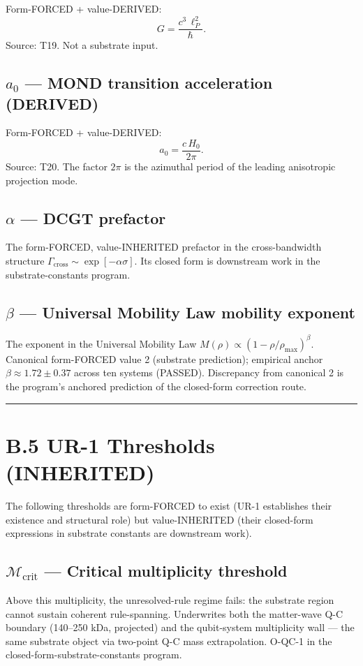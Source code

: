 \documentclass[11pt]{book}
\begin{document}
Form-FORCED + value-DERIVED:
\[
G = \frac{c^3\,\ell_P^2}{\hbar}.
\]
Source: T19. Not a substrate input.

\subsection{$a_0$ — MOND transition acceleration (DERIVED)}

Form-FORCED + value-DERIVED:
\[
a_0 = \frac{c\,H_0}{2\pi}.
\]
Source: T20. The factor $2\pi$ is the azimuthal period of the leading anisotropic projection mode.

\subsection{$\alpha$ — DCGT prefactor}

The form-FORCED, value-INHERITED prefactor in the cross-bandwidth structure $\Gamma_\mathrm{cross}\sim\exp[-\alpha\sigma]$. Its closed form is downstream work in the substrate-constants program.

\subsection{$\beta$ — Universal Mobility Law mobility exponent}

The exponent in the Universal Mobility Law $M(\rho) \propto (1 - \rho/\rho_\mathrm{max})^\beta$. Canonical form-FORCED value 2 (substrate prediction); empirical anchor $\beta \approx 1.72 \pm 0.37$ across ten systems (PASSED). Discrepancy from canonical 2 is the program's anchored prediction of the closed-form correction route.

\bigskip\hrule\bigskip

\section{B.5 UR-1 Thresholds (INHERITED)}

The following thresholds are form-FORCED to exist (UR-1 establishes their existence and structural role) but value-INHERITED (their closed-form expressions in substrate constants are downstream work).

\subsection{$\mathcal{M}_\mathrm{crit}$ — Critical multiplicity threshold}

Above this multiplicity, the unresolved-rule regime fails: the substrate region cannot sustain coherent rule-spanning. Underwrites both the matter-wave Q-C boundary (140–250 kDa, projected) and the qubit-system multiplicity wall — the same substrate object via two-point Q-C mass extrapolation. O-QC-1 in the closed-form-substrate-constants program.
\end{document}
